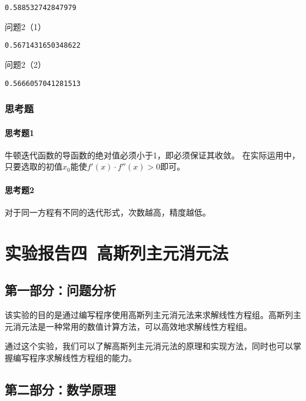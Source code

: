\documentclass[a4paper,zihao=4,UTF8]{ctexart}
\begin{document}
\begin{lstlisting}
0.588532742847979
\end{lstlisting}

问题2（1）

\begin{lstlisting}
0.5671431650348622
\end{lstlisting}

问题2（2）

\begin{lstlisting}
0.5666057041281513
\end{lstlisting}

\subsubsection*{思考题}

\paragraph*{思考题1}

牛顿迭代函数的导函数的绝对值必须小于1，即必须保证其收敛。
在实际运用中，只要选取的初值$x_0$能使$f'(x)\cdot f''(x)>0$即可。

\paragraph*{思考题2}

对于同一方程有不同的迭代形式，次数越高，精度越低。

\newpage
\section*{ \textbf{实验报告四\ 高斯列主元消元法}}

\subsection*{第一部分：问题分析}

该实验的目的是通过编写程序使用高斯列主元消元法来求解线性方程组。高斯列主元消元法是一种常用的数值计算方法，可以高效地求解线性方程组。

通过这个实验，我们可以了解高斯列主元消元法的原理和实现方法，同时也可以掌握编写程序求解线性方程组的能力。

\subsection*{第二部分：数学原理}
\end{document}
